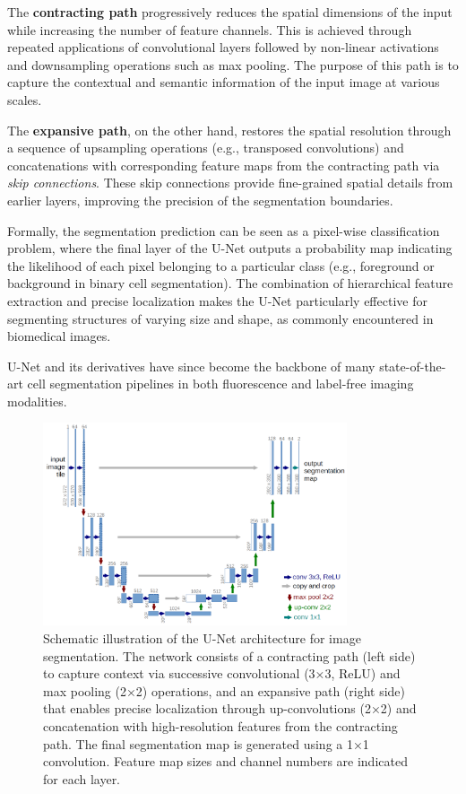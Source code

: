 The \textbf{contracting path} progressively reduces the spatial dimensions of the input while increasing the number of feature channels. This is achieved through repeated applications of convolutional layers followed by non-linear activations and downsampling operations such as max pooling. The purpose of this path is to capture the contextual and semantic information of the input image at various scales.

The \textbf{expansive path}, on the other hand, restores the spatial resolution through a sequence of upsampling operations (e.g., transposed convolutions) and concatenations with corresponding feature maps from the contracting path via \textit{skip connections}. These skip connections provide fine-grained spatial details from earlier layers, improving the precision of the segmentation boundaries.

Formally, the segmentation prediction can be seen as a pixel-wise classification problem, where the final layer of the U-Net outputs a probability map indicating the likelihood of each pixel belonging to a particular class (e.g., foreground or background in binary cell segmentation). The combination of hierarchical feature extraction and precise localization makes the U-Net particularly effective for segmenting structures of varying size and shape, as commonly encountered in biomedical images.

U-Net and its derivatives have since become the backbone of many state-of-the-art cell segmentation pipelines in both fluorescence and label-free imaging modalities.

\begin{figure}[!ht]
    \centering
    \includegraphics[width=0.8\textwidth]{Images/SOTA/u-net-architecture.png}
    \caption{Schematic illustration of the U-Net architecture for image segmentation. The network consists of a contracting path (left side) to capture context via successive convolutional (3×3, ReLU) and max pooling (2×2) operations, and an expansive path (right side) that enables precise localization through up-convolutions (2×2) and concatenation with high-resolution features from the contracting path. The final segmentation map is generated using a 1×1 convolution. Feature map sizes and channel numbers are indicated for each layer.}
    \label{fig:unet}
\end{figure}

